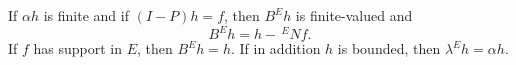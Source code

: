 If $\alpha h$ is finite and if $(I - P)h = f$, then $B^E h$ is finite-valued and
$$B^E h = h - \,^{E}\!N f.$$
If $f$ has support in $E$, then $B^E h = h$. If in addition $h$ is bounded, then $\lambda^E h = \alpha h$.
